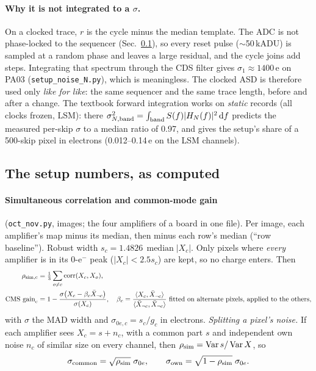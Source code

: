 \documentclass[10pt,a4paper]{article}
\newcommand{\code}[1]{\texttt{\small #1}}
\newcommand{\dd}{\,\mathrm{d}}
\newcommand{\med}{\operatorname{median}}
\begin{document}
\paragraph{Why it is not integrated to a $\sigma$.} On a clocked trace, $r$ is the cycle minus the median template.
The ADC is not phase-locked to the sequencer (Sec.~\ref{sec:circuit}), so every reset pulse ($\sim$50\,kADU) is
sampled at a random phase and leaves a large residual, and the cycle joins add steps. Integrating that spectrum through
the CDS filter gives $\sigma_1\approx1400$\,e on PA03 (\code{setup\_noise\_N.py}), which is meaningless. The clocked
ASD is therefore used only \emph{like for like}: the same sequencer and the same trace length, before and after a
change. The textbook forward integration works on \emph{static} records (all clocks frozen, LSM): there
$\sigma^2_{N,\rm band}=\int_{\rm band}S(f)|H_N(f)|^2\dd f$ predicts the measured per-skip $\sigma$ to a median ratio of
0.97, and gives the setup's share of a 500-skip pixel in electrons (0.012--0.14\,e on the LSM channels).

\subsection{The setup numbers, as computed}\label{sec:circuit}

\paragraph{Simultaneous correlation and common-mode gain} (\code{oct\_nov.py}, images; the four amplifiers of a board
in one file). Per image, each amplifier's map minus its median, then minus each row's median (``row baseline''). Robust
width $s_c=1.4826\,\med|X_c|$. Only pixels where \emph{every} amplifier is in its 0-e$^-$ peak ($|X_c|<2.5s_c$) are
kept, so no charge enters. Then
\begin{align}
\rho_{\rm sim,c}&=\tfrac13\sum_{o\ne c}\operatorname{corr}(X_c,X_o),\\
\text{CMS gain}_c&=1-\frac{\sigma\big(X_c-\beta_c\bar X_{\neg c}\big)}{\sigma(X_c)},\quad
\beta_c=\frac{\langle X_c,\bar X_{\neg c}\rangle}{\langle\bar X_{\neg c},\bar X_{\neg c}\rangle}
\ \text{fitted on alternate pixels, applied to the others,}
\end{align}
with $\sigma$ the MAD width and $\sigma_{0e,c}=s_c/g_c$ in electrons.
\emph{Splitting a pixel's noise.} If each amplifier sees $X_c=s+n_c$, with a common part $s$ and independent own
noise $n_c$ of similar size on every channel, then $\rho_{\rm sim}=\operatorname{Var}s/\operatorname{Var}X$, so
\begin{equation}
\sigma_{\rm common}=\sqrt{\rho_{\rm sim}}\;\sigma_{0e},\qquad \sigma_{\rm own}=\sqrt{1-\rho_{\rm sim}}\;\sigma_{0e}.
\end{equation}
\end{document}
